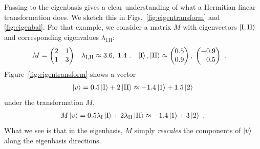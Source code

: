 \documentclass[12pt, oneside]{report}    %
\begin{document}
Passing to the eigenbasis gives a clear understanding of what a Hermitian linear transformation does. We sketch this in Figs.~\ref{fig:eigentransform} and \ref{fig:eigenbal}. For that example, we consider a matrix $M$ with eigenvectors $\left|{\textnormal{I},\textnormal{II}}\right\rangle$ and corresponding eigenvalues $\lambda_{\text{I},\text{II}}$:
\begin{align}
    M &= \begin{pmatrix}
        2 & 1 \\
        1 & 3
    \end{pmatrix}
    &
    \lambda_{\text{I},\text{II}} &\approx 3.6,\; 1.4 \ .
    &
    \ket{\text{I}},\ket{\text{II}}&\approx
    \begin{pmatrix}
        0.5 \\ 0.9
    \end{pmatrix},
    \;
    \begin{pmatrix}
        -0.9 \\ \pp 0.5
    \end{pmatrix} \ .
\end{align}
Figure~\ref{fig:eigentransform} shows a vector 
\begin{align}
    \left|v\right\rangle = 0.5\left|\textnormal{I}\right\rangle + 2\left|\textnormal{II}\right\rangle \approx
    -1.4\left|1\right\rangle + 1.5 \left|2\right\rangle 
    \label{eq:eigen:example:v}
\end{align}
under the transformation $M$,
\begin{align}
    M\left|v\right\rangle = 0.5\lambda_\textnormal{I}\left|\textnormal{I}\right\rangle + 2 \lambda_\textnormal{II}\left|\textnormal{II}\right\rangle \approx
    -1.4\left|1\right\rangle + 3 \left|2\right\rangle \ .
    \label{eq:eigen:example:Mv}
\end{align}
What we see is that in the eigenbasis, $M$ simply \emph{rescales} the components of $\left|v\right\rangle$ along the eigenbasis directions. 
\end{document}
